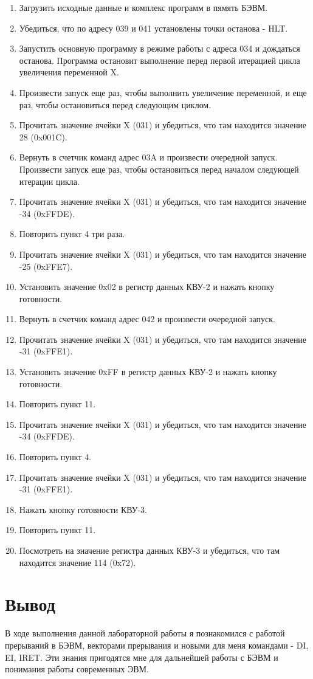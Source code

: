 \begin{enumerate}
\item Загрузить исходные данные и комплекс программ в пямять БЭВМ.
\item Убедиться, что по адресу 039 и 041 установлены точки останова - HLT.
\item Запустить основную программу в режиме работы с адреса 034 и дождаться останова. Программа остановит выполнение перед первой итерацией цикла увеличения переменной X.
\item Произвести запуск еще раз, чтобы выполнить увеличение переменной, и еще раз, чтобы остановиться перед следующим циклом.
\item Прочитать значение ячейки X (031) и убедиться, что там находится значение 28 (0x001C).
\item Вернуть в счетчик команд адрес 03A и произвести очередной запуск. Произвести запуск еще раз, чтобы остановиться перед началом следующей итерации цикла.
\item Прочитать значение ячейки X (031) и убедиться, что там находится значение -34 (0xFFDE).
\item Повторить пункт 4 три раза.
\item Прочитать значение ячейки X (031) и убедиться, что там находится значение -25 (0xFFE7).
\item Установить значение 0x02 в регистр данных КВУ-2 и нажать кнопку готовности.
\item Вернуть в счетчик команд адрес 042 и произвести очередной запуск.
\item Прочитать значение ячейки X (031) и убедиться, что там находится значение -31 (0xFFE1).
\item Установить значение 0xFF в регистр данных КВУ-2 и нажать кнопку готовности.
\item Повторить пункт 11.
\item Прочитать значение ячейки X (031) и убедиться, что там находится значение -34 (0xFFDE).
\item Повторить пункт 4.
\item Прочитать значение ячейки X (031) и убедиться, что там находится значение -31 (0xFFE1).
\item Нажать кнопку готовности КВУ-3.
\item Повторить пункт 11.
\item Посмотреть на значение регистра данных КВУ-3 и убедиться, что там находится значение 114 (0x72).
\end{enumerate}

\section{Вывод}
В ходе выполнения данной лабораторной работы я познакомился с работой прерываний в БЭВМ, векторами прерывания и новыми для меня командами - DI, EI, IRET. Эти знания пригодятся мне для дальнейшей работы с БЭВМ и понимания работы современных ЭВМ.
